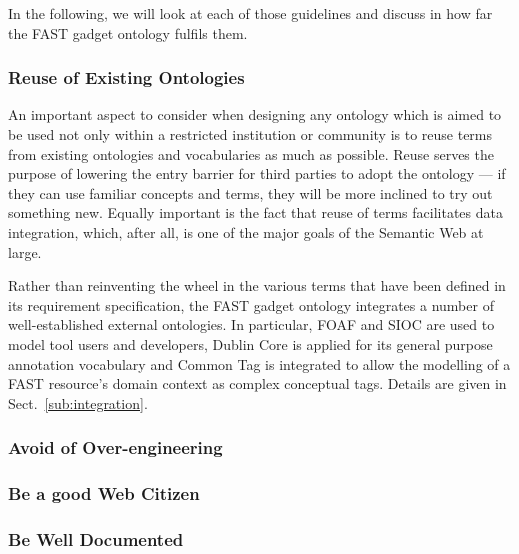 \documentclass{fast_latex}
\begin{document}
In the following, we will look at each of those guidelines and discuss in how far the FAST gadget ontology fulfils them.

\subsubsection{Reuse of Existing Ontologies} %
\label{ssub:reuse_of_existing_ontologies}

An important aspect to consider when designing any ontology which is aimed to be used not only within a restricted institution or community is to reuse terms from existing ontologies and vocabularies as much as possible. Reuse serves the purpose of lowering the entry barrier for third parties to adopt the ontology --- if they can use familiar concepts and terms, they will be more inclined to try out something new. Equally important is the fact that reuse of terms facilitates data integration, which, after all, is one of the major goals of the Semantic Web at large.

Rather than reinventing the wheel in the various terms that have been defined in its requirement specification, the FAST gadget ontology integrates a number of well-established external ontologies. In particular, FOAF and SIOC are used to model tool users and developers, Dublin Core is applied for its general purpose annotation vocabulary and Common Tag is integrated to allow the modelling of a FAST resource's domain context as complex conceptual tags. Details are given in Sect.~\ref{sub:integration}.

\subsubsection{Avoid of Over-engineering} %
\label{ssub:avoid_of_over_engineering}


\subsubsection{Be a good Web Citizen} %
\label{ssub:be_a_good_web_citizen}


\subsubsection{Be Well Documented} %
\label{ssub:be_well_documented}
\end{document}
